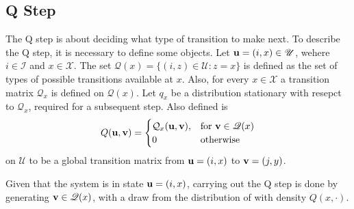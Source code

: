 \subsection{Q Step} The Q step is about deciding what type of transition to make next. 
To describe the Q step, it is necessary to define some objects. Let $\mathbf{u} = (i,x) \in {\mathscr U}$, wehere $i\in \mathscr I$ and $x\in\mathscr X$.
The set $\mathscr Q(x) = \{(i,z) \in \mathscr U : z = x\}$ is defined as the set of types of possible transitions available at $x$.
Also, for every $x \in \mathscr X$ a transition matrix $\mathcal Q_x$ is defined on $\mathscr Q(x)$. Let $q_x$ be a distribution stationary with resepct to $\mathcal Q_x$, required for a subsequent step. 
Also defined is
	\begin{equation}
		Q(\mathbf{u},\mathbf{v}) = 
			\begin{cases}
			\mathcal Q_x(\mathbf{u},\mathbf{v}), & \text{for } \mathbf{v} \in \mathscr Q(x)\\
			0 & \text{otherwise} 
			\end{cases}
		\end{equation}
on $\mathscr U$ to be a global transition matrix from $\mathbf{u} = (i,x)$ to $\mathbf{v} = (j,y)$.

Given that the system is in state $\mathbf{u} = (i,x)$, carrying out the Q step is done by generating $\mathbf{v} \in \mathscr Q(x)$, with a draw from the distribution of with density $Q(x,\cdot)$.

